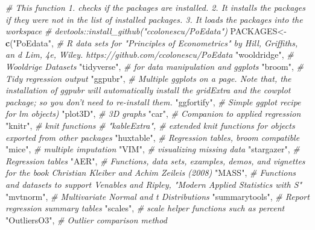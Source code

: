 \documentclass[]{book}
\newenvironment{Shaded}{\begin{snugshade}}{\end{snugshade}}
\newcommand{\CommentTok}[1]{\textcolor[rgb]{0.56,0.35,0.01}{\textit{#1}}}
\newcommand{\KeywordTok}[1]{\textcolor[rgb]{0.13,0.29,0.53}{\textbf{#1}}}
\newcommand{\NormalTok}[1]{#1}
\newcommand{\StringTok}[1]{\textcolor[rgb]{0.31,0.60,0.02}{#1}}
\begin{document}
\begin{Shaded}
\begin{Highlighting}[]
\CommentTok{# This function 1. checks if the packages are installed. 2. It installs the packages if they were not in the list of installed packages. 3. It loads the packages into the workspace}
\CommentTok{# devtools::install_github("ccolonescu/PoEdata")}
\NormalTok{PACKAGES<-}\KeywordTok{c}\NormalTok{(}\StringTok{"PoEdata"}\NormalTok{, }\CommentTok{# R data sets for "Principles of Econometrics" by Hill, Griffiths, an d Lim, 4e, Wiley. https://github.com/ccolonescu/PoEdata}
            \StringTok{"wooldridge"}\NormalTok{,  }\CommentTok{# Wooldrige Datasets}
            \StringTok{"tidyverse"}\NormalTok{,  }\CommentTok{# for data manipulation and ggplots}
            \StringTok{"broom"}\NormalTok{,  }\CommentTok{# Tidy regression output}
            \StringTok{"ggpubr"}\NormalTok{,  }\CommentTok{# Multiple ggplots on a page. Note that, the installation of ggpubr will automatically install the gridExtra and the cowplot package; so you don’t need to re-install them. }
            \StringTok{"ggfortify"}\NormalTok{, }\CommentTok{# Simple ggplot recipe for lm objects) }
            \StringTok{"plot3D"}\NormalTok{,  }\CommentTok{#  3D graphs}
            \StringTok{"car"}\NormalTok{, }\CommentTok{# Companion to applied regression}
            \StringTok{"knitr"}\NormalTok{, }\CommentTok{# knit functions}
            \CommentTok{# "kableExtra", # extended knit functions for objects exported from other packages}
            \StringTok{"huxtable"}\NormalTok{, }\CommentTok{#  Regression tables, broom compatible}
            \StringTok{"mice"}\NormalTok{,  }\CommentTok{# multiple imputation}
            \StringTok{"VIM"}\NormalTok{, }\CommentTok{# visualizing missing data}
            \StringTok{"stargazer"}\NormalTok{, }\CommentTok{# Regression tables}
            \StringTok{"AER"}\NormalTok{, }\CommentTok{#  Functions, data sets, examples, demos, and vignettes for the book Christian Kleiber and Achim Zeileis (2008)}
            \StringTok{"MASS"}\NormalTok{,  }\CommentTok{#  Functions and datasets to support Venables and Ripley,  "Modern Applied Statistics with S"}
            \StringTok{"mvtnorm"}\NormalTok{, }\CommentTok{# Multivariate Normal and t Distributions }
            \StringTok{"summarytools"}\NormalTok{, }\CommentTok{# Report regression summary tables}
            \StringTok{"scales"}\NormalTok{, }\CommentTok{# scale helper functions such as percent }
            \StringTok{"OutliersO3"}\NormalTok{, }\CommentTok{# Outlier comparison method}

\end{Highlighting}
\end{Shaded}
\end{document}
